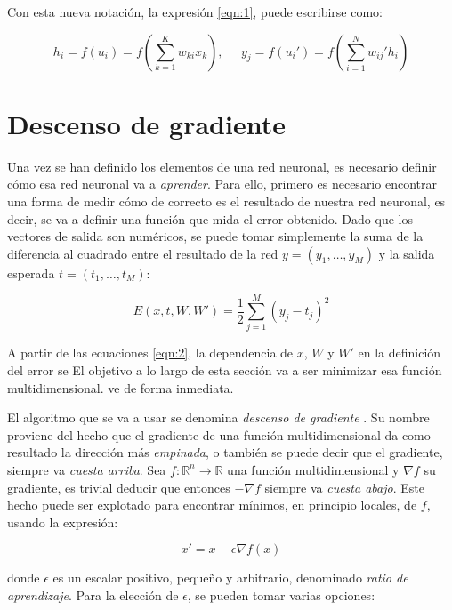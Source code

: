 Con esta nueva notación, la expresión \ref{eqn:1}, puede escribirse como:

\begin{equation}
    \label{eqn:2}
    h_i = f(u_i) = f\left(\sum_{k=1}^K w_{ki} x_k\right), \;\;\;\;\;
    y_j = f(u_i') = f\left(\sum_{i=1}^N w_{ij}' h_i\right)
\end{equation}

\section{Descenso de gradiente}

Una vez se han definido los elementos de una red neuronal, es necesario definir cómo esa red neuronal
va a \textit{aprender}. Para ello, primero es necesario encontrar una forma de medir cómo de correcto
es el resultado de nuestra red neuronal, es decir, se va a definir una función que mida el error obtenido.
Dado que los vectores de salida son numéricos, se puede tomar simplemente la suma de la diferencia al
cuadrado entre el resultado de la red $y = (y_1, \ldots, y_M)$ y la salida esperada $t = (t_1, \ldots, t_M)$:

\begin{equation}
    \label{eqn:3}
    E(x, t, W, W') = \frac{1}{2}\sum_{j=1}^M(y_j-t_j)^2
\end{equation}

A partir de las ecuaciones \ref{eqn:2}, la dependencia de $x$, $W$ y $W'$ en la definición del error se
El objetivo a lo largo de esta sección va a ser minimizar esa función multidimensional.
ve de forma inmediata.

El algoritmo que se va a usar se denomina \textit{descenso de gradiente} \cite{lemarechal2012cauchy}.
Su nombre proviene del hecho
que el gradiente de una función multidimensional da como resultado la dirección más \textit{empinada},
o también se puede decir que el gradiente, siempre va \textit{cuesta arriba}. Sea $f \colon \mathbb{R}^n \longrightarrow \mathbb{R}$
una función multidimensional y $\nabla f$ su gradiente, es trivial deducir que entonces $-\nabla f$
siempre va \textit{cuesta abajo}. Este hecho puede ser explotado para encontrar mínimos, en principio locales,
de $f$, usando la expresión:


\begin{equation}
    \label{eqn:gradient_descent}
    x'=x-\epsilon\nabla f(x)
\end{equation}

donde $\epsilon$ es un escalar positivo, pequeño y arbitrario, denominado \textit{ratio de aprendizaje}.
Para la elección de $\epsilon$, se pueden tomar
varias opciones:

